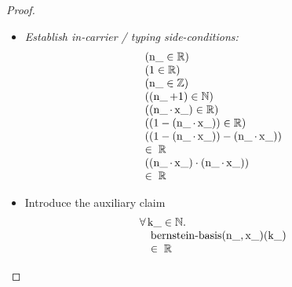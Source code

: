 \documentclass[11pt]{article}
\theoremstyle{plain}
\begin{document}
\begin{proof}
\begin{itemize}[leftmargin=2.8em, itemsep=4pt, parsep=1pt]
  \item[\textbf{5--12}] \emph{Establish in-carrier / typing side-conditions:}
\begin{equation*}
\begin{array}{@{}l@{}}
(\operatorname{n\_} \in \mathbb{R}) \\
(1 \in \mathbb{R}) \\
(\operatorname{n\_} \in \mathbb{Z}) \\
((\operatorname{n\_} + 1) \in \mathbb{N}) \\
((\operatorname{n\_} \cdot \operatorname{x\_}) \in \mathbb{R}) \\
((1 - (\operatorname{n\_} \cdot \operatorname{x\_})) \in \mathbb{R}) \\
\begin{array}{@{}l@{}} ((1 - (\operatorname{n\_} \cdot \operatorname{x\_})) - (\operatorname{n\_} \cdot \operatorname{x\_})) \\ \in\; \mathbb{R} \end{array} \\
\begin{array}{@{}l@{}} ((\operatorname{n\_} \cdot \operatorname{x\_}) \cdot (\operatorname{n\_} \cdot \operatorname{x\_})) \\ \in\; \mathbb{R} \end{array}
\end{array}
\end{equation*}

  \item[\textbf{13}] Introduce the auxiliary claim
\begin{equation*}
\begin{array}{@{}l@{}} \forall \operatorname{k\_} \in \mathbb{N}. \\ \quad \operatorname{bernstein\text{-}basis}(\operatorname{n\_}, \operatorname{x\_})(\operatorname{k\_}) \\ \quad \in\; \mathbb{R} \end{array}
\end{equation*}


\end{itemize}
\end{proof}
\end{document}
